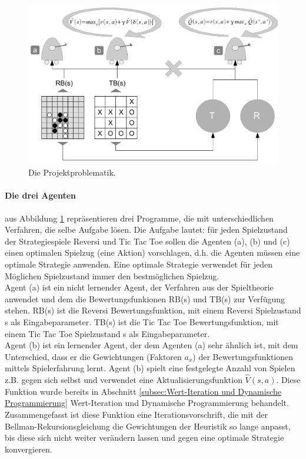 \begin{figure}[!htbp]
  \centering
  \includegraphics[scale = 0.6]{inhalt/abbildungen/drei_agenten.pdf}
  \caption{Die Projektproblematik.}
  \label{fig:drei_agenten}
\end{figure} 

\paragraph{Die drei Agenten} aus Abbildung \ref{fig:drei_agenten} repräsentieren drei Programme, die mit unterschiedlichen Verfahren, die selbe Aufgabe lösen. Die Aufgabe lautet: für jeden Spielzustand der Strategiespiele Reversi und Tic Tac Toe sollen die Agenten (a), (b) und (c) einen optimalen Spielzug (eine Aktion) vorschlagen, d.h. die Agenten müssen eine optimale Strategie anwenden. Eine optimale Strategie verwendet für jeden Möglichen Spielzustand immer den bestmöglichen Spielzug. \\

Agent (a) ist ein nicht lernender Agent, der Verfahren aus der Spieltheorie anwendet und dem die Bewertungsfunkionen RB(s) und TB(s) zur Verfügung stehen. RB(s) ist die Reversi Bewertungsfunktion, mit einem Reversi Spielzustand s als Eingabeparameter. TB(s) ist die Tic Tac Toe Bewertungsfunktion, mit einem Tic Tac Toe Spielzustand s als Eingabeparameter. \\

Agent (b) ist ein lernender Agent, der dem Agenten (a) sehr ähnlich ist, mit dem Unterschied, dass er die Gewichtungen (Faktoren $a_x$) der Bewertungsfunktionen mittels Spielerfahrung lernt. Agent (b) spielt eine festgelegte Anzahl von Spielen z.B. gegen sich selbst und verwendet eine Aktualisierungsfunktion $\hat{V}(s,a)$. Diese Funktion wurde bereits in Abschnitt \ref{subsec:Wert-Iteration und Dynamische Programmierung} Wert-Iteration und Dynamische Programmierung behandelt. Zusammengefasst ist diese Funktion eine Iterationsvorschrift, die mit der Bellman-Rekursionsgleichung die Gewichtungen der Heuristik so lange anpasst, bis diese sich nicht weiter verändern lassen und gegen eine optimale Strategie konvergieren. \\

